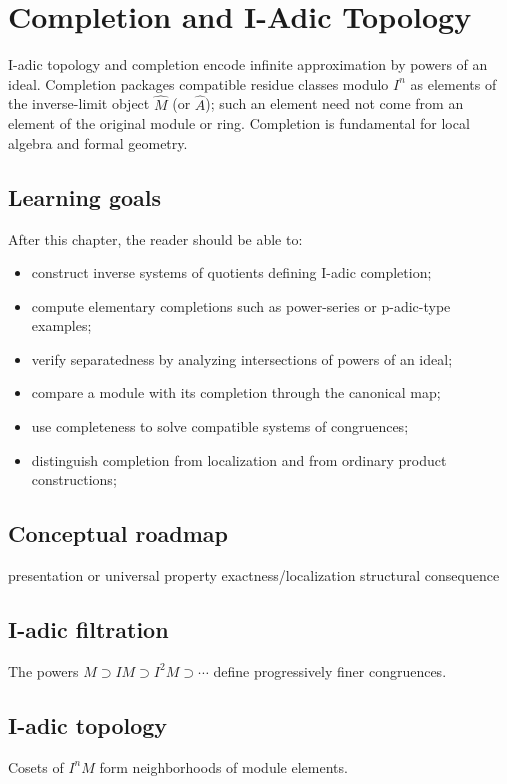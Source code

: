 \chapter{Completion and I-Adic Topology}
\label{ch:v18}

I-adic topology and completion encode infinite approximation by powers of an ideal. Completion packages compatible residue classes modulo $I^n$ as elements of the inverse-limit object \(\widehat M\) (or \(\widehat A\)); such an element need not come from an element of the original module or ring. Completion is fundamental for local algebra and formal geometry.

\section*{Learning goals}
After this chapter, the reader should be able to:
\begin{itemize}
\item construct inverse systems of quotients defining I-adic completion;
\item compute elementary completions such as power-series or p-adic-type examples;
\item verify separatedness by analyzing intersections of powers of an ideal;
\item compare a module with its completion through the canonical map;
\item use completeness to solve compatible systems of congruences;
\item distinguish completion from localization and from ordinary product constructions;
\end{itemize}
\section*{Conceptual roadmap}
\volroadmap
  {presentation or universal property}
  {exactness/localization}
  {structural consequence}

\section{I-adic filtration}
The powers $M\supset IM\supset I^2M\supset\cdots$ define progressively finer congruences.

\section{I-adic topology}
Cosets of $I^nM$ form neighborhoods of module elements.

